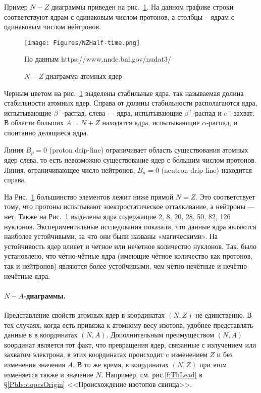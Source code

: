 \documentclass[a5paper,openany]{book}
\begin{document}
	Пример $N-Z$ диаграммы приведен на рис.~\ref{f:NZHalf-time}. На данном графике строки  соответствуют ядрам с одинаковым числом протонов, а столбцы – ядрам с одинаковым числом нейтронов.	
	
	
	
	
	\begin{figure}[ht] 
		\centering\small
		\unitlength=1mm
		\texttt{[image: Figures/NZHalf-time.png]} 
		\caption{$N-Z$ диаграмма  атомных ядер} По данным https://www.nndc.bnl.gov/nudat3/ \cite{NUDAT3}
		\label{f:NZHalf-time}
	\end{figure}
	Черным цветом на рис.~\ref{f:NZHalf-time} выделены стабильные ядра, так называемая долина стабильности атомных ядер.  
	Справа от долины стабильности располагаются ядра, испытывающие $\beta^{-}$-распад, слева --- ядра, испытывающие $\beta^{+}$-распад и $e^{-}$-захват. В области больших $A = N+Z$ находятся ядра, испытывающие $\alpha$-распад, и спонтанно делящиеся ядра. 
	
	Линия $B_p = 0$ (proton drip-line) ограничивает	область существования атомных ядер слева,
	то есть невозможно существование ядер с б\'{о}льшим числом протонов.
	Линия, ограничивающее число нейтронов, $B_n = 0$ (neutron drip-line) находится справа.
	
	На Рис.~\ref{f:NZHalf-time} большинство элементов лежит ниже прямой $N=Z$. Это соответствует тому, что протоны испытывают электростатическое отталкивание, а нейтроны --- нет.
	Также на Рис.~\ref{f:NZHalf-time} выделены ядра содержащие 2, 8, 20, 28, 50, 82, 126 нуклонов. Экспериментальные исследования показали, что данные ядра являются наиболее устойчивыми, за что они были названы «магическими».  	 	 	
	На устойчивость ядер влияет и четное или нечетное количество нуклонов. Так, было установлено, что чётно-чётные ядра (имеющие чётное количество как протонов, так и нейтронов) являются более устойчивыми, чем чётно-нечётные и нечётно-нечётные ядра.  

	\paragraph{$N-A$-диаграммы.}	
Представление свойств атомных ядер в координатах $(N,Z)$ не единственно. В тех случаях, когда есть привязка к атомному весу изотопа, удобнее представлять данные в в координатах $(N,A)$. 
Дополнительным преимуществом  $(N,A)$ координат является  тот факт, что превращения ядер, связанные с излучением или захватом электрона, в этих координатах происходит c изменением $Z$ и без изменения значения $A$. В то же время, в координатах  $(N,Z)$ при этом изменяется также и значение $N$. Например, см. рис.\ref{f:ThLead} в \S\ref{PbIsotopesOrigin} <<Происхождение изотопов свинца>>.
\end{document}
